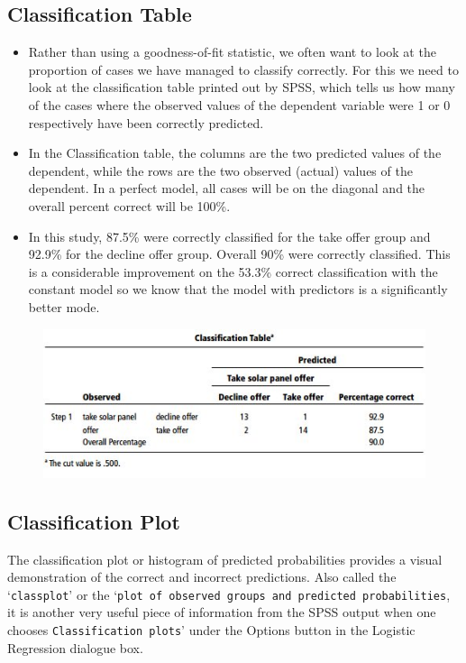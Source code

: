 \documentclass[a4paper,12pt]{article}
\begin{document}
\subsection*{Classification Table}
\begin{itemize}
\item Rather than using a goodness-of-fit statistic, we often want to look at the proportion of cases we have managed to classify correctly. For this we need to look at the classification table printed out by SPSS, which tells us how many of the cases where the observed values of the dependent variable were 1 or 0 respectively have
been correctly predicted.
\item 
In the Classification table, the columns are the two predicted values of the dependent, while the rows are the two observed (actual) values of the dependent. In a perfect model, all cases will be on the diagonal and the
overall percent correct will be 100\%. 
\item In this study, 87.5\% were correctly classified for the take offer group and 92.9\% for the decline offer group. Overall 90\% were correctly classified. This is a considerable improvement on the 53.3\% correct classification with the constant model so we know that the model with predictors is a significantly better mode.
\end{itemize}
\begin{figure}[h!]
	\begin{center}
		\includegraphics[scale=0.8]{images/Logistic7}\\
	\end{center}
\end{figure}

\subsection*{Classification Plot} 
The classification plot or histogram of predicted probabilities
provides a visual demonstration of the correct and incorrect predictions. Also called the `\texttt{classplot}' or the `\texttt{plot of observed groups and predicted probabilities}, it is another very useful piece of information from the SPSS output when one chooses
\texttt{Classification plots}' under the Options button in the Logistic Regression dialogue box.
\end{document}
